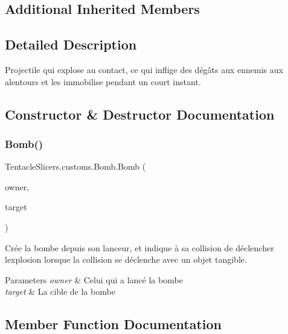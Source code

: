 \subsection*{Additional Inherited Members}


\subsection{Detailed Description}
Projectile qui explose au contact, ce qui inflige des dégâts aux ennemis aux alentours et les immobilise pendant un court instant. 



\subsection{Constructor \& Destructor Documentation}
\mbox{\label{class_tentacle_slicers_1_1customs_1_1_bomb_a0b4e34b54ffd0005636cd79faad018aa}} 
\subsubsection{\texorpdfstring{Bomb()}{Bomb()}}
{\footnotesize\ttfamily Tentacle\+Slicers.\+customs.\+Bomb.\+Bomb (\begin{DoxyParamCaption}\item[{\hyperlink{class_tentacle_slicers_1_1actors_1_1_controlled_actor}{Controlled\+Actor}}]{owner,  }\item[{\hyperlink{class_tentacle_slicers_1_1general_1_1_point}{Point}}]{target }\end{DoxyParamCaption})}



Crée la bombe depuis son lanceur, et indique à sa collision de déclencher l\textquotesingle{}explosion lorsque la collision se déclenche avec un objet tangible. 


\begin{DoxyParams}{Parameters}
{\em owner} & Celui qui a lancé la bombe \\
\hline
{\em target} & La cible de la bombe \\
\hline
\end{DoxyParams}


\subsection{Member Function Documentation}
\mbox{\label{class_tentacle_slicers_1_1customs_1_1_bomb_aefe2c2dcf1c3159e161f781c4d0d08d7}} 
